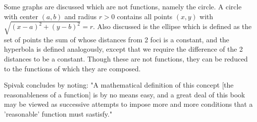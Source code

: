\documentclass{article}
\begin{document}
\begin{flushleft}
Some graphs are discussed which are not functions, namely the circle. A circle with center $(a,b)$ and radius $r > 0$ contains all points $(x,y)$ with $\sqrt{(x-a)^2 + (y-b)^2} = r$. Also discussed is the ellipse which is defined as the set of points the sum of whose distances from 2 foci is a constant, and the hyperbola is defined analogously, except that we require the difference of the 2 distances to be a constant. Though these are not functions, they can be reduced to the functions of which they are composed.
\end{flushleft}

\begin{flushleft}
Spivak concludes by noting: "A mathematical definition of this concept [the reasonableness of a function] is by no means easy, and a great deal of this book may be viewed as successive attempts to impose more and more conditions that a 'reasonable' function must sastisfy."
\end{flushleft}
\end{document}
